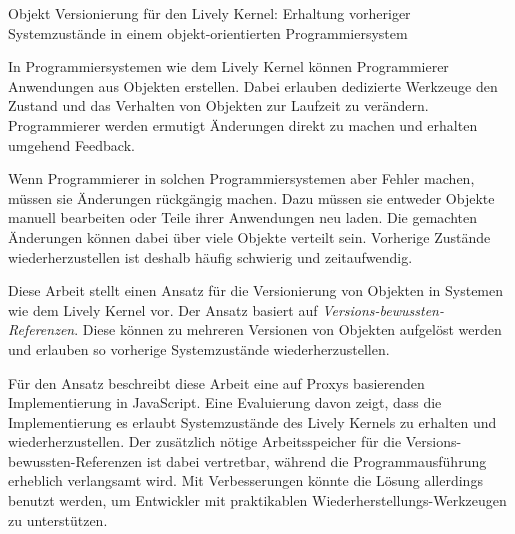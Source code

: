 \begin{zusammenfassung}

{\Large Objekt Versionierung für den Lively Kernel: Erhaltung vorheriger Systemzustände in einem objekt-orientierten Programmiersystem}

In Programmiersystemen wie dem Lively Kernel können Programmierer Anwendungen aus Objekten erstellen.
Dabei erlauben dedizierte Werkzeuge den Zustand und das Verhalten von Objekten zur Laufzeit zu verändern.
Programmierer werden ermutigt Änderungen direkt zu machen und erhalten umgehend Feedback.

Wenn Programmierer in solchen Programmiersystemen aber Fehler machen, müssen sie Änderungen rückgängig machen.
Dazu müssen sie entweder Objekte manuell bearbeiten oder Teile ihrer Anwendungen neu laden.
Die gemachten Änderungen können dabei über viele Objekte verteilt sein.
Vorherige Zustände wiederherzustellen ist deshalb häufig schwierig und zeitaufwendig.

Diese Arbeit stellt einen Ansatz für die Versionierung von Objekten in Systemen wie dem Lively Kernel vor.
Der Ansatz basiert auf \emph{Versions-bewussten-Referenzen}.
Diese können zu mehreren Versionen von Objekten aufgelöst werden und erlauben so vorherige Systemzustände wiederherzustellen.

Für den Ansatz beschreibt diese Arbeit eine auf Proxys basierenden Implementierung in JavaScript.
Eine Evaluierung davon zeigt, dass die Implementierung es erlaubt Systemzustände des Lively Kernels zu erhalten und wiederherzustellen.
Der zusätzlich nötige Arbeitsspeicher für die Versions-bewussten-Referenzen ist dabei vertretbar, während die Programmausführung erheblich verlangsamt wird.
Mit Verbesserungen könnte die Lösung allerdings benutzt werden, um Entwickler mit praktikablen Wiederherstellungs-Werkzeugen zu unterstützen.

\end{zusammenfassung}

